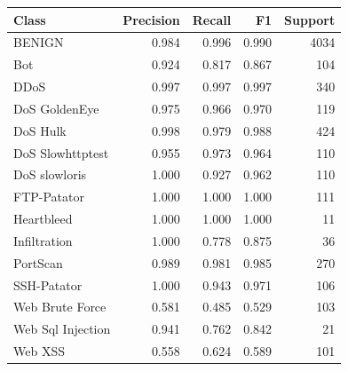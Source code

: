 \begin{tabular}{lrrrr}
\toprule
Class & Precision & Recall & F1 & Support \\
\midrule
BENIGN & 0.984 & 0.996 & 0.990 & 4034 \\
Bot & 0.924 & 0.817 & 0.867 & 104 \\
DDoS & 0.997 & 0.997 & 0.997 & 340 \\
DoS GoldenEye & 0.975 & 0.966 & 0.970 & 119 \\
DoS Hulk & 0.998 & 0.979 & 0.988 & 424 \\
DoS Slowhttptest & 0.955 & 0.973 & 0.964 & 110 \\
DoS slowloris & 1.000 & 0.927 & 0.962 & 110 \\
FTP-Patator & 1.000 & 1.000 & 1.000 & 111 \\
Heartbleed & 1.000 & 1.000 & 1.000 & 11 \\
Infiltration & 1.000 & 0.778 & 0.875 & 36 \\
PortScan & 0.989 & 0.981 & 0.985 & 270 \\
SSH-Patator & 1.000 & 0.943 & 0.971 & 106 \\
Web Brute Force & 0.581 & 0.485 & 0.529 & 103 \\
Web Sql Injection & 0.941 & 0.762 & 0.842 & 21 \\
Web XSS & 0.558 & 0.624 & 0.589 & 101 \\
\bottomrule
\end{tabular}
